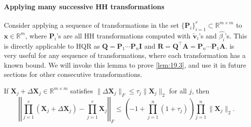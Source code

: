 \documentclass[review,onefignum,onetabnum]{siamart190516}
\newcommand{\R}{\mathbb{R}}
\newcommand{\bb}[1]{\mathbf{#1}}
\begin{document}
\paragraph{Applying many successive HH transformations}
Consider applying a sequence of transformations in the set $\{\bb{P}_{i}\}_{i=1}^r\subset\R^{m\times m}$ to $\bb{x}\in\R^m$, where $\bb{P}_{i}$'s are all HH transformations computed with $\tilde{\bb{v}}_i$'s and $\hat{\beta_i}$'s.
This is directly applicable to HQR as $\bb{Q}=\bb{P}_{1}\cdots\bb{P}_{n}\bb{I}$ and $\bb{R} = \bb{Q}^{\top}\bb{A} = \bb{P}_{n}\cdots\bb{P}_{1}\bb{A}$.
 is very useful for any sequence of transformations, where each transformation has a known bound.
We will invoke this lemma to prove \cref{lem:19.3}, and use it in future sections for other consecutive transformations.
\begin{lemma}\label{lem:3.7}
	If $\bb{X}_{j} + \Delta \bb{X}_{j} \in\R^{m\times m}$ satisfies $\|\Delta \bb{X}_{j}\|_F\leq \tau_j \|\bb{X}_{j}\|_2$ for all $j$, then $$\left|\left|\prod_{j=1}^r (\bb{X}_{j} + \Delta \bb{X}_{j})- \prod_{j=1}^r\bb{X}_{j} \right|\right|_F\leq\left(-1+\prod_{j=1}^n(1+\tau_j)\right)\prod_{j=1}^n\|\bb{X}_{j}\|_2.$$
\end{lemma}
\end{document}
